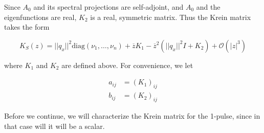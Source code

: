 \documentclass[12pt]{article}
\begin{document}
Since $A_0$ and its spectral projections are self-adjoint, and $A_0$ and the eigenfunctions are real, $K_2$ is a real, symmetric matrix. Thus the Krein matrix takes the form

\begin{equation}\label{Kreinform}
K_S(z) = ||q_x||^2 \text{diag}(\nu_1, \dots, \nu_n) + \overline{z} K_1 
- \overline{z}^2 ( ||q_x||^2 I + K_2) + \mathcal{O}(|z|^3)
\end{equation}

where $K_1$ and $K_2$ are defined above. For convenience, we let

\begin{align*}
a_{ij} &= (K_1)_{ij} \\
b_{ij} &= (K_2)_{ij}
\end{align*}

Before we continue, we will characterize the Krein matrix for the 1-pulse, since in that case will it will be a scalar.

\end{document}
